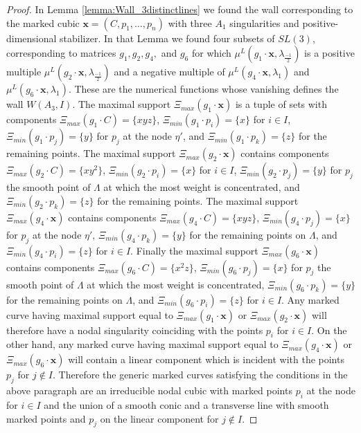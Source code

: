 \documentclass{amsart}
\numberwithin{equation}{section}
\theoremstyle{definition}
\begin{document}
\begin{proof}
     In Lemma \ref{lemma:Wall_3distinctlines} we found the wall corresponding to the marked cubic $\mathbf{x} = (C, p_1, \dots , p_n)$ with three $A_1$ singularities and positive-dimensional stabilizer. In that Lemma we found four subsets of $SL(3)$, corresponding to matrices $g_1,g_2,g_4,$ and $g_6$ for which $\mu^L(g_1 \cdot \mathbf{x}, \lambda_{\frac{-1}{2}})$ is a positive multiple $\mu^L(g_2 \cdot \mathbf{x}, \lambda_{\frac{-1}{2}})$ and a negative multiple of $\mu^L(g_4 \cdot \mathbf{x}, \lambda_1)$ and $\mu^L(g_6 \cdot \mathbf{x}, \lambda_1)$. These are the numerical functions whose vanishing defines the wall $W(A_3, I)$. The maximal support $\Xi_{max}(g_1 \cdot \mathbf{x})$ is a tuple of sets with components $\Xi_{max}(g_1 \cdot C) = \{xyz\}$, $\Xi_{min}(g_1 \cdot p_i) = \{x\}$ for $i \in I$, $\Xi_{min}(g_1 \cdot p_j) = \{y\}$ for $p_j$ at the node $\eta'$, and $\Xi_{min}(g_1 \cdot p_k) = \{z\}$ for the remaining points. The maximal support $\Xi_{max}(g_2 \cdot \mathbf{x})$ contains components $\Xi_{max}(g_2 \cdot C) = \{xy^2\}$, $\Xi_{min}(g_2 \cdot p_i) = \{x\}$ for $i \in I$, $\Xi_{min}(g_2 \cdot p_j) = \{y\}$ for $p_j$ the smooth point of $\Lambda$ at which the most weight is concentrated, and $\Xi_{min}(g_2 \cdot p_k) = \{z\}$ for the remaining points. The maximal support $\Xi_{max}(g_4 \cdot \mathbf{x})$ contains components $\Xi_{max}(g_4 \cdot C) = \{xyz\}$, $\Xi_{min}(g_4 \cdot p_j) = \{x\}$ for $p_j$ at the node $\eta'$, $\Xi_{min}(g_4 \cdot p_k) = \{y\}$ for the remaining points on $\Lambda$, and $\Xi_{min}(g_4 \cdot p_i) = \{z\}$ for $i \in I$. Finally the maximal support $\Xi_{max}(g_6 \cdot \mathbf{x})$ contains components $\Xi_{max}(g_6 \cdot C) = \{x^2z\}$, $\Xi_{min}(g_6 \cdot p_j) = \{x\}$ for $p_j$ the smooth point of $\Lambda$ at which the most weight is concentrated, $\Xi_{min}(g_6 \cdot p_k) = \{y\}$ for the remaining points on $\Lambda$, and $\Xi_{min}(g_6 \cdot p_i) = \{z\}$ for $i \in I$. Any marked curve having maximal support equal to $\Xi_{max}(g_1 \cdot \mathbf{x})$ or $\Xi_{max}(g_2 \cdot \mathbf{x})$ will therefore have a nodal singularity coinciding with the points $p_i$ for $i \in I$. On the other hand, any marked curve having maximal support equal to $\Xi_{max}(g_4 \cdot \mathbf{x})$ or $\Xi_{max}(g_6 \cdot \mathbf{x})$ will contain a linear component which is incident with the points $p_j$ for $j \notin I$. Therefore the generic marked curves satisfying the conditions in the above paragraph are an irreducible nodal cubic with marked points $p_i$ at the node for $i \in I$ and the union of a smooth conic and a transverse line with smooth marked points and $p_j$ on the linear component for $j \notin I$.


\end{proof}
\end{document}
